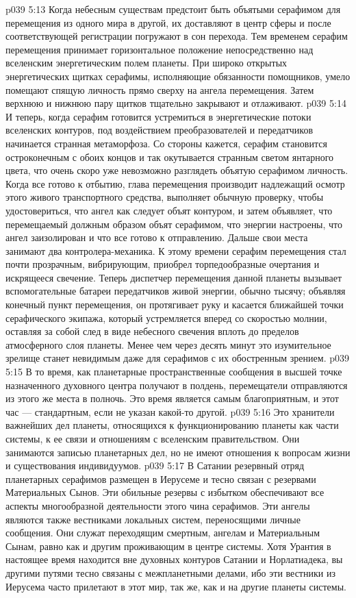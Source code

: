 \vs p039 5:13 \pc Когда небесным существам предстоит быть объятыми серафимом для перемещения из одного мира в другой, их доставляют в центр сферы и после соответствующей регистрации погружают в сон перехода. Тем временем серафим перемещения принимает горизонтальное положение непосредственно над вселенским энергетическим полем планеты. При широко открытых энергетических щитках серафимы, исполняющие обязанности помощников, умело помещают спящую личность прямо сверху на ангела перемещения. Затем верхнюю и нижнюю пару щитков тщательно закрывают и отлаживают.
\vs p039 5:14 И теперь, когда серафим готовится устремиться в энергетические потоки вселенских контуров, под воздействием преобразователей и передатчиков начинается странная метаморфоза. Со стороны кажется, серафим становится остроконечным с обоих концов и так окутывается странным светом янтарного цвета, что очень скоро уже невозможно разглядеть объятую серафимом личность. Когда все готово к отбытию, глава перемещения производит надлежащий осмотр этого живого транспортного средства, выполняет обычную проверку, чтобы удостовериться, что ангел как следует объят контуром, и затем объявляет, что перемещаемый должным образом объят серафимом, что энергии настроены, что ангел заизолирован и что все готово к отправлению. Дальше свои места занимают два контролера\hyp{}механика. К этому времени серафим перемещения стал почти прозрачным, вибрирующим, приобрел торпедообразные очертания и искрящееся свечение. Теперь диспетчер перемещения данной планеты вызывает вспомогательные батареи передатчиков живой энергии, обычно тысячу; объявляя конечный пункт перемещения, он протягивает руку и касается ближайшей точки серафического экипажа, который устремляется вперед со скоростью молнии, оставляя за собой след в виде небесного свечения вплоть до пределов атмосферного слоя планеты. Менее чем через десять минут это изумительное зрелище станет невидимым даже для серафимов с их обостренным зрением.
\vs p039 5:15 \pc В то время, как планетарные пространственные сообщения в высшей точке назначенного духовного центра получают в полдень, перемещатели отправляются из этого же места в полночь. Это время является самым благоприятным, и этот час --- стандартным, если не указан какой\hyp{}то другой.
\vs p039 5:16 \bibnobreakspace {} Это хранители важнейших дел планеты, относящихся к функционированию планеты как части системы, к ее связи и отношениям с вселенским правительством. Они занимаются записью планетарных дел, но не имеют отношения к вопросам жизни и существования индивидуумов.
\vs p039 5:17 \bibnobreakspace {} В Сатании резервный отряд планетарных серафимов размещен в Иерусеме и тесно связан с резервами Материальных Сынов. Эти обильные резервы с избытком обеспечивают все аспекты многообразной деятельности этого чина серафимов. Эти ангелы являются также вестниками локальных систем, переносящими личные сообщения. Они служат переходящим смертным, ангелам и Материальным Сынам, равно как и другим проживающим в центре системы. Хотя Урантия в настоящее время находится вне духовных контуров Сатании и Норлатиадека, вы другими путями тесно связаны с межпланетными делами, ибо эти вестники из Иерусема часто прилетают в этот мир, так же, как и на другие планеты системы.
